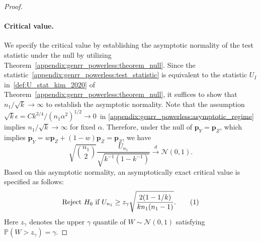 \documentclass[twoside,11pt]{article}
\newcommand\numberthis{\addtocounter{equation}{1}\tag{\theequation}}
\newcommand{\rvTwo}{Y}
\newcommand{\rvThree}{Z}
\newcommand{\mP}{\mathbb{P}} %
\newcommand{\alphabetSize}{k} %
\newcommand{\sampleSize}{n}
\newcommand{\probVec}{\mathbf{p}} %
\newcommand{\privacyParameter}{\alpha} %
\begin{document}
\begin{appendix}
\begin{proof}
		\paragraph{Critical value.}
		We  specify the critical value by establishing the asymptotic normality of the test statistic under the null by utilizing Theorem~\ref{appendix:genrr_powerless:theorem_null}.
		Since the statistic~\eqref{appendix:genrr_powerless:test_statistic} is equivalent to the statistic $U_I$ in~\eqref{def:U_stat_kim_2020} of Theorem~\ref{appendix:genrr_powerless:theorem_null}, it suffices to show that $\sampleSize_1 / \sqrt{\alphabetSize} \to \infty$ to establish the asymptotic normality.
		Note that the assumption	$\sqrt{\alphabetSize} \epsilon = C
		\alphabetSize^{3/4}
		/
		(\sampleSize_1 \privacyParameter^2)^{1/2} \to 0$~in \eqref{appendix:genrr_powerless:asymptotic_regime} implies $\sampleSize_1 / \sqrt{\alphabetSize} \to \infty$ for fixed $\privacyParameter$. 
		Therefore, under the null of $\probVec_\rvTwo =\probVec_\rvThree$, which implies  $
		\probVec_{\tilde{\rvTwo}} =
		w \probVec_\rvThree + (1-w)\probVec_\rvThree = \probVec_\rvThree$, we have
		\begin{equation*}
			\sqrt{\binom{\sampleSize_1}{2}} \frac{U_{\sampleSize_1}}{\sqrt{
					\alphabetSize^{-1}  (1 - \alphabetSize^{-1})}} \overset{d}{\longrightarrow} \mathcal{N}(0, 1).   
		\end{equation*}
		\noindent
		Based on this asymptotic normality, an asymptotically exact critical value is specified as follows:
		\begin{align*}
			\text{Reject}~H_0~\text{if}~	U_{\sampleSize_1} \geq
			z_{\gamma}
			\sqrt{
				\frac{
					2(1 -  1/ \alphabetSize)}{
					\alphabetSize n_1(n_1-1)}
			}.
			\numberthis \label{appendix:genrr_powerless:critical_value}
		\end{align*}
		Here $z_{\gamma}$ denotes the upper $\gamma$ quantile of $W \sim \mathcal{N}(0,1)$ satisfying $\mP(W > z_\gamma) = \gamma$. 
		

\end{proof}
\end{appendix}
\end{document}
